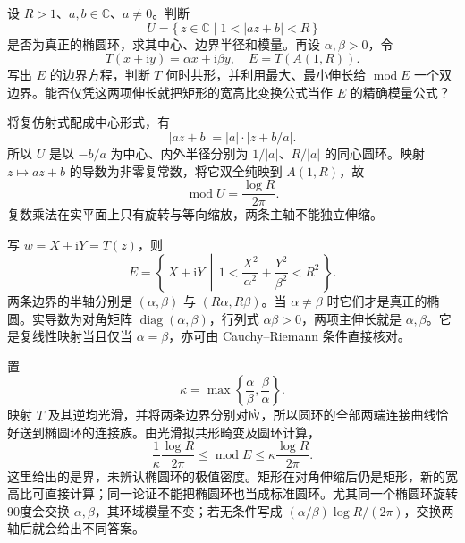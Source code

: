\begin{exercise}\label{b3:ex:08-1}
设 \(R>1\)、\(a,b\in\mathbb C\)、\(a\ne0\)。判断
\[
 U=\{\,z\in\mathbb C\mid1<|az+b|<R\,\}
\]
是否为真正的椭圆环，求其中心、边界半径和模量。再设 \(\alpha,\beta>0\)，令
\[
 T(x+\mathrm{i}y)=\alpha x+\mathrm{i}\beta y,\quad
 E=T(A(1,R)).
\]
写出 \(E\) 的边界方程，判断 \(T\) 何时共形，并利用最大、最小伸长给 \(\operatorname{mod}E\) 一个双边界。能否仅凭这两项伸长就把矩形的宽高比变换公式当作 \(E\) 的精确模量公式？
\end{exercise}
\begin{solution}
将复仿射式配成中心形式，有
\[
 |az+b|=|a|\cdot|z+b/a|.
\]
所以 \(U\) 是以 \(-b/a\) 为中心、内外半径分别为 \(1/|a|\)、\(R/|a|\) 的同心圆环。映射 \(z\mapsto az+b\) 的导数为非零复常数，将它双全纯映到 \(A(1,R)\)，故
\[
 \operatorname{mod}U=\frac{\log R}{2\pi}.
\]
复数乘法在实平面上只有旋转与等向缩放，两条主轴不能独立伸缩。

写 \(w=X+\mathrm{i}Y=T(z)\)，则
\[
 E=\left\{\,X+\mathrm{i}Y\,\middle|\,
 1<\frac{X^2}{\alpha^2}+\frac{Y^2}{\beta^2}<R^2\,\right\}.
\]
两条边界的半轴分别是 \((\alpha,\beta)\) 与 \((R\alpha,R\beta)\)。当 \(\alpha\ne\beta\) 时它们才是真正的椭圆。实导数为对角矩阵 \(\operatorname{diag}(\alpha,\beta)\)，行列式 \(\alpha\beta>0\)，两项主伸长就是 \(\alpha,\beta\)。它是复线性映射当且仅当 \(\alpha=\beta\)，亦可由 Cauchy--Riemann 条件直接核对。

置
\[
 \kappa=\max\left\{\frac\alpha\beta,\frac\beta\alpha\right\}.
\]
映射 \(T\) 及其逆均光滑，并将两条边界分别对应，所以圆环的全部两端连接曲线恰好送到椭圆环的连接族。由光滑拟共形畸变及圆环计算，
\[
 \frac1\kappa\frac{\log R}{2\pi}
 \le\operatorname{mod}E
 \le\kappa\frac{\log R}{2\pi}.
\]
这里给出的是界，未辨认椭圆环的极值密度。矩形在对角伸缩后仍是矩形，新的宽高比可直接计算；同一论证不能把椭圆环也当成标准圆环。尤其同一个椭圆环旋转90度会交换 \(\alpha,\beta\)，其环域模量不变；若无条件写成 \((\alpha/\beta)\log R/(2\pi)\)，交换两轴后就会给出不同答案。
\end{solution}

